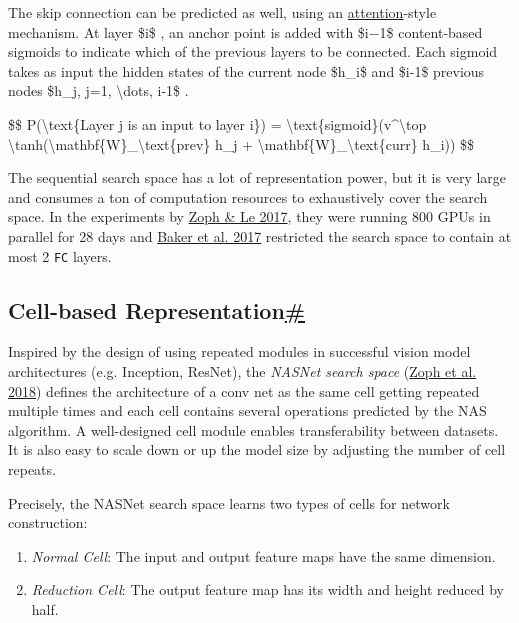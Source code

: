 The skip connection can be predicted as well, using an \href{https://lilianweng.github.io/posts/2018-06-24-attention/}{attention}-style mechanism. At layer \$i\$ , an anchor point is added with \$i−1\$ content-based sigmoids to indicate which of the previous layers to be connected. Each sigmoid takes as input the hidden states of the current node \$h\_i\$ and \$i-1\$ previous nodes \$h\_j, j=1, \textbackslash dots, i-1\$ .

\$\$ P(\textbackslash text\{Layer j is an input to layer i\}) = \textbackslash text\{sigmoid\}(v\^{}\textbackslash top \textbackslash tanh(\textbackslash mathbf\{W\}\_\textbackslash text\{prev\} h\_j + \textbackslash mathbf\{W\}\_\textbackslash text\{curr\} h\_i)) \$\$

The sequential search space has a lot of representation power, but it is very large and consumes a ton of computation resources to exhaustively cover the search space. In the experiments by \href{https://arxiv.org/abs/1611.01578}{Zoph \& Le 2017}, they were running 800 GPUs in parallel for 28 days and \href{https://arxiv.org/abs/1611.02167}{Baker et al. 2017} restricted the search space to contain at most 2 \texttt{FC} layers.

\subsection{\texorpdfstring{Cell-based Representation\hyperref[cell-based-representation]{\#}}{Cell-based Representation\#}}\label{cell-based-representation}

Inspired by the design of using repeated modules in successful vision model architectures (e.g. Inception, ResNet), the \emph{NASNet search space} (\href{https://arxiv.org/abs/1707.07012}{Zoph et al. 2018}) defines the architecture of a conv net as the same cell getting repeated multiple times and each cell contains several operations predicted by the NAS algorithm. A well-designed cell module enables transferability between datasets. It is also easy to scale down or up the model size by adjusting the number of cell repeats.

Precisely, the NASNet search space learns two types of cells for network construction:

\begin{enumerate}
\tightlist
\item
  \emph{Normal Cell}: The input and output feature maps have the same dimension.
\item
  \emph{Reduction Cell}: The output feature map has its width and height reduced by half.
\end{enumerate}

